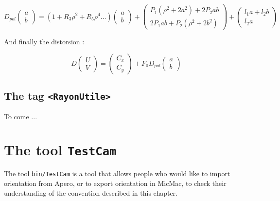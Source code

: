 \begin{equation}
   D_{pol}\begin{pmatrix}a\\b\end{pmatrix}
   = (1+R_3 \rho^2 + R_5 \rho^4  \dots ) \begin{pmatrix}a\\b\end{pmatrix}
    + \begin{pmatrix}P_1( \rho^2+2a^2) + 2P_2ab \\ 2P_1ab + P_2(\rho^2+2b^2)\end{pmatrix}
    +\begin{pmatrix}  l_1 a + l_2 b \\  l_2 a  \end{pmatrix}
\end{equation}

And finally the distorsion :


\begin{equation}
   D\begin{pmatrix}U\\V\end{pmatrix}
   = \begin{pmatrix}C_x\\C_y\end{pmatrix} + F_0 D_{pol}\begin{pmatrix}a\\b\end{pmatrix}
\end{equation}




\subsection{The tag {\tt <RayonUtile>}}

\label{SpGep:RU}

To come ...



\section{The tool {\tt TestCam}}

The tool {\tt bin/TestCam} is a tool that allows people who would like
to import orientation from Apero, or to export orientation in MicMac,
to check their understanding of the convention described in this chapter.


